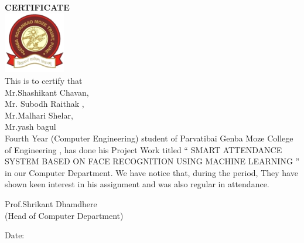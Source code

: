 \begin{titlepage}
\begin{center}
\vspace{0.2cm}
\textbf{CERTIFICATE}\\[0.7in]
\includegraphics[width=0.2\textwidth]{logo.png}\\[0.1in]
This is to certify that \\ Mr.Shashikant Chavan,\\ Mr. Subodh Raithak ,\\ Mr.Malhari Shelar,\\ Mr.yash bagul  \\ Fourth Year (Computer Engineering) student of Parvatibai Genba Moze College of Engineering , has done his Project Work titled
“ SMART ATTENDANCE SYSTEM BASED ON FACE
RECOGNITION USING MACHINE LEARNING ” in our Computer Department.
We have notice that, during the period, They have shown keen interest in his assignment and was also regular in attendance.\\



\begin{flushright}
Prof.Shrikant Dhamdhere
\\
(Head of Computer Department)\\
\end{flushright}
\begin{flushleft}
Date:
\end{flushleft}


\end{center}

\end{titlepage}

